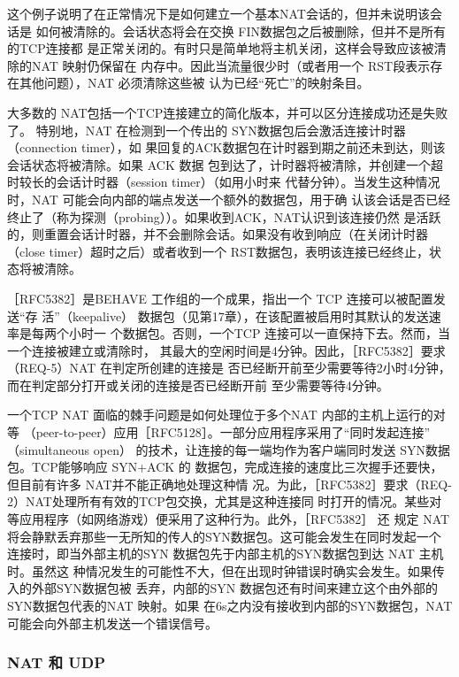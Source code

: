 这个例子说明了在正常情况下是如何建立一个基本NAT会话的，但并未说明该会话是
如何被清除的。会话状态将会在交换 FIN数据包之后被删除，但并不是所有的TCP连接都
是正常关闭的。有时只是简单地将主机关闭，这样会导致应该被清除的NAT 映射仍保留在
内存中。因此当流量很少时（或者用一个 RST段表示存在其他问题），NAT 必须清除这些被
认为已经“死亡”的映射条目。

大多数的 NAT包括一个TCP连接建立的简化版本，并可以区分连接成功还是失败了。
特别地，NAT 在检测到一个传出的 SYN数据包后会激活连接计时器（connection timer），如
果回复的ACK数据包在计时器到期之前还未到达，则该会话状态将被清除。如果 ACK 数据
包到达了，计时器将被清除，并创建一个超时较长的会话计时器（session timer）（如用小时来
代替分钟）。当发生这种情况时，NAT 可能会向内部的端点发送一个额外的数据包，用于确
认该会话是否已经终止了（称为探测（probing））。如果收到ACK，NAT认识到该连接仍然
是活跃的，则重置会话计时器，并不会删除会话。如果没有收到响应（在关闭计时器（close
timer）超时之后）或者收到一个 RST数据包，表明该连接已经终止，状态将被清除。

［RFC5382］是BEHAVE 工作组的一个成果，指出一个 TCP 连接可以被配置发送“存
活”（keepalive） 数据包（见第17章），在该配置被启用时其默认的发送速率是每两个小时一
个数据包。否则，一个TCP 连接可以一直保持下去。然而，当一个连接被建立或清除时，
其最大的空闲时间是4分钟。因此，［RFC5382］要求（REQ-5）NAT 在判定所创建的连接是
否已经断开前至少需要等待2小时4分钟，而在判定部分打开或关闭的连接是否已经断开前
至少需要等待4分钟。

一个TCP NAT 面临的棘手问题是如何处理位于多个NAT 内部的主机上运行的对等
（peer-to-peer）应用［RFC5128］。一部分应用程序采用了“同时发起连接” （simultaneous open）
的技术，让连接的每一端均作为客户端同时发送 SYN数据包。TCP能够响应 SYN+ACK 的
数据包，完成连接的速度比三次握手还要快，但目前有许多 NAT并不能正确地处理这种情
况。为此，［RFC5382］要求（REQ-2）NAT处理所有有效的TCP包交换，尤其是这种连接同
时打开的情况。某些对等应用程序（如网络游戏）便采用了这种行为。此外，［RFC5382］ 还
规定 NAT 将会静默丢弃那些一无所知的传人的SYN数据包。这可能会发生在同时发起一个
连接时，即当外部主机的SYN 数据包先于内部主机的SYN数据包到达 NAT 主机时。虽然这
种情况发生的可能性不大，但在出现时钟错误时确实会发生。如果传入的外部SYN数据包被
丢弃，内部的SYN 数据包还有时间来建立这个由外部的SYN数据包代表的NAT 映射。如果
在6s之内没有接收到内部的SYN数据包，NAT 可能会向外部主机发送一个错误信号。

\subsubsection{NAT 和 UDP}

